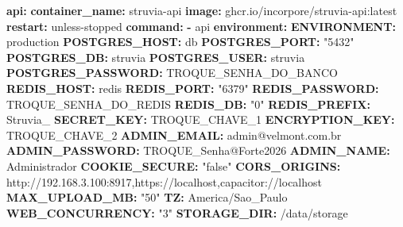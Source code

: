 \documentclass[
  10pt,
]{article}
\newenvironment{Shaded}{\begin{snugshade}}{\end{snugshade}}
\newcommand{\AttributeTok}[1]{\textcolor[rgb]{0.13,0.29,0.53}{#1}}
\newcommand{\FunctionTok}[1]{\textcolor[rgb]{0.13,0.29,0.53}{\textbf{#1}}}
\newcommand{\KeywordTok}[1]{\textcolor[rgb]{0.13,0.29,0.53}{\textbf{#1}}}
\newcommand{\StringTok}[1]{\textcolor[rgb]{0.31,0.60,0.02}{#1}}
\begin{document}
\begin{Shaded}
\begin{Highlighting}[]
\AttributeTok{  }\FunctionTok{api}\KeywordTok{:}
\AttributeTok{    }\FunctionTok{container\_name}\KeywordTok{:}\AttributeTok{ struvia{-}api}
\AttributeTok{    }\FunctionTok{image}\KeywordTok{:}\AttributeTok{ ghcr.io/incorpore/struvia{-}api:latest}
\AttributeTok{    }\FunctionTok{restart}\KeywordTok{:}\AttributeTok{ unless{-}stopped}
\AttributeTok{    }\FunctionTok{command}\KeywordTok{:}
\AttributeTok{      }\KeywordTok{{-}}\AttributeTok{ api}
\AttributeTok{    }\FunctionTok{environment}\KeywordTok{:}
\AttributeTok{      }\FunctionTok{ENVIRONMENT}\KeywordTok{:}\AttributeTok{ production}
\AttributeTok{      }\FunctionTok{POSTGRES\_HOST}\KeywordTok{:}\AttributeTok{ db}
\AttributeTok{      }\FunctionTok{POSTGRES\_PORT}\KeywordTok{:}\AttributeTok{ }\StringTok{"5432"}
\AttributeTok{      }\FunctionTok{POSTGRES\_DB}\KeywordTok{:}\AttributeTok{ struvia}
\AttributeTok{      }\FunctionTok{POSTGRES\_USER}\KeywordTok{:}\AttributeTok{ struvia}
\AttributeTok{      }\FunctionTok{POSTGRES\_PASSWORD}\KeywordTok{:}\AttributeTok{ TROQUE\_SENHA\_DO\_BANCO}
\AttributeTok{      }\FunctionTok{REDIS\_HOST}\KeywordTok{:}\AttributeTok{ redis}
\AttributeTok{      }\FunctionTok{REDIS\_PORT}\KeywordTok{:}\AttributeTok{ }\StringTok{"6379"}
\AttributeTok{      }\FunctionTok{REDIS\_PASSWORD}\KeywordTok{:}\AttributeTok{ TROQUE\_SENHA\_DO\_REDIS}
\AttributeTok{      }\FunctionTok{REDIS\_DB}\KeywordTok{:}\AttributeTok{ }\StringTok{"0"}
\AttributeTok{      }\FunctionTok{REDIS\_PREFIX}\KeywordTok{:}\AttributeTok{ Struvia\_}
\AttributeTok{      }\FunctionTok{SECRET\_KEY}\KeywordTok{:}\AttributeTok{ TROQUE\_CHAVE\_1}
\AttributeTok{      }\FunctionTok{ENCRYPTION\_KEY}\KeywordTok{:}\AttributeTok{ TROQUE\_CHAVE\_2}
\AttributeTok{      }\FunctionTok{ADMIN\_EMAIL}\KeywordTok{:}\AttributeTok{ admin@velmont.com.br}
\AttributeTok{      }\FunctionTok{ADMIN\_PASSWORD}\KeywordTok{:}\AttributeTok{ TROQUE\_Senha@Forte2026}
\AttributeTok{      }\FunctionTok{ADMIN\_NAME}\KeywordTok{:}\AttributeTok{ Administrador}
\AttributeTok{      }\FunctionTok{COOKIE\_SECURE}\KeywordTok{:}\AttributeTok{ }\StringTok{"false"}
\AttributeTok{      }\FunctionTok{CORS\_ORIGINS}\KeywordTok{:}\AttributeTok{ http://192.168.3.100:8917,https://localhost,capacitor://localhost}
\AttributeTok{      }\FunctionTok{MAX\_UPLOAD\_MB}\KeywordTok{:}\AttributeTok{ }\StringTok{"50"}
\AttributeTok{      }\FunctionTok{TZ}\KeywordTok{:}\AttributeTok{ America/Sao\_Paulo}
\AttributeTok{      }\FunctionTok{WEB\_CONCURRENCY}\KeywordTok{:}\AttributeTok{ }\StringTok{"3"}
\AttributeTok{      }\FunctionTok{STORAGE\_DIR}\KeywordTok{:}\AttributeTok{ /data/storage}

\end{Highlighting}
\end{Shaded}
\end{document}
